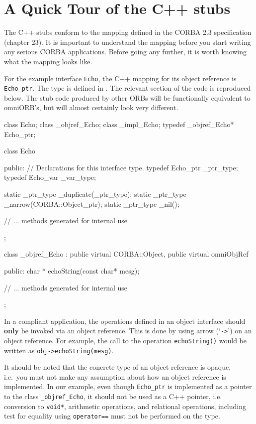 \documentclass[11pt,twoside,a4paper]{book}
\newcommand{\type}[1]{\texttt{#1}}
\newcommand{\intf}[1]{\texttt{#1}}
\newcommand{\code}[1]{\texttt{#1}}
\newcommand{\op}[1]{\texttt{#1()}}
\newcommand{\file}{\begingroup \urlstyle{tt}\Url}
\begin{document}
\section{A Quick Tour of the C++ stubs}

The C++ stubs conform to the mapping defined in the CORBA 2.3
specification (chapter 23). It is important to understand the mapping
before you start writing any serious CORBA applications. Before going
any further, it is worth knowing what the mapping looks like.

For the example interface \intf{Echo}, the C++ mapping for its object
reference is \type{Echo\_ptr}. The type is defined in \file{echo.hh}.
The relevant section of the code is reproduced below. The stub code
produced by other ORBs will be functionally equivalent to omniORB's,
but will almost certainly look very different.

\begin{cxxlisting}
class Echo;
class _objref_Echo;
class _impl_Echo;
typedef _objref_Echo* Echo_ptr;

class Echo {
public:
  // Declarations for this interface type.
  typedef Echo_ptr _ptr_type;
  typedef Echo_var _var_type;

  static _ptr_type _duplicate(_ptr_type);
  static _ptr_type _narrow(CORBA::Object_ptr);
  static _ptr_type _nil();

  // ... methods generated for internal use
};

class _objref_Echo :
  public virtual CORBA::Object, public virtual omniObjRef {
public:
  char * echoString(const char* mesg);

  // ... methods generated for internal use
};
\end{cxxlisting}

In a compliant application, the operations defined in an object
interface should \textbf{only} be invoked via an object reference.
This is done by using arrow (`\code{->}') on an object reference.
For example, the call to the operation \op{echoString} would be
written as \code{obj->echoString(mesg)}.

It should be noted that the concrete type of an object reference is
opaque, i.e.\ you must not make any assumption about how an object
reference is implemented. In our example, even though \type{Echo\_ptr}
is implemented as a pointer to the class \type{\_objref\_Echo}, it
should not be used as a C++ pointer, i.e. conversion to \type{void*},
arithmetic operations, and relational operations, including test for
equality using \code{operator==} must not be performed on the type.
\end{document}
